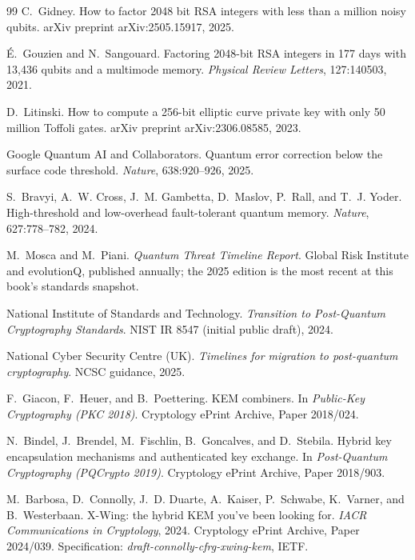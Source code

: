 \begin{thebibliography}{99}
 C.~Gidney.
\newblock How to factor 2048 bit RSA integers with less than a million noisy qubits.
\newblock arXiv preprint arXiv:2505.15917, 2025.

 \'E.~Gouzien and N.~Sangouard.
\newblock Factoring 2048-bit RSA integers in 177 days with 13,436 qubits and a
multimode memory.
\newblock \emph{Physical Review Letters}, 127:140503, 2021.

 D.~Litinski.
\newblock How to compute a 256-bit elliptic curve private key with only 50
million Toffoli gates.
\newblock arXiv preprint arXiv:2306.08585, 2023.

 Google Quantum AI and Collaborators.
\newblock Quantum error correction below the surface code threshold.
\newblock \emph{Nature}, 638:920--926, 2025.

 S.~Bravyi, A.~W. Cross, J.~M. Gambetta, D.~Maslov,
P.~Rall, and T.~J. Yoder.
\newblock High-threshold and low-overhead fault-tolerant quantum memory.
\newblock \emph{Nature}, 627:778--782, 2024.

 M.~Mosca and M.~Piani.
\newblock \emph{Quantum Threat Timeline Report}.
\newblock Global Risk Institute and evolutionQ, published annually; the 2025
edition is the most recent at this book's standards snapshot.

 National Institute of Standards and Technology.
\newblock \emph{Transition to Post-Quantum Cryptography Standards}.
\newblock NIST IR 8547 (initial public draft), 2024.

 National Cyber Security Centre (UK).
\newblock \emph{Timelines for migration to post-quantum cryptography}.
\newblock NCSC guidance, 2025.

 F.~Giacon, F.~Heuer, and B.~Poettering.
\newblock KEM combiners.
\newblock In \emph{Public-Key Cryptography (PKC 2018)}. Cryptology ePrint Archive, Paper 2018/024.

 N.~Bindel, J.~Brendel, M.~Fischlin, B.~Goncalves, and D.~Stebila.
\newblock Hybrid key encapsulation mechanisms and authenticated key exchange.
\newblock In \emph{Post-Quantum Cryptography (PQCrypto 2019)}. Cryptology ePrint Archive, Paper 2018/903.

 M.~Barbosa, D.~Connolly, J.~D. Duarte, A.~Kaiser, P.~Schwabe, K.~Varner, and B.~Westerbaan.
\newblock X-Wing: the hybrid KEM you've been looking for.
\newblock \emph{IACR Communications in Cryptology}, 2024. Cryptology ePrint Archive, Paper 2024/039.
Specification: \emph{draft-connolly-cfrg-xwing-kem}, IETF.


\end{thebibliography}

